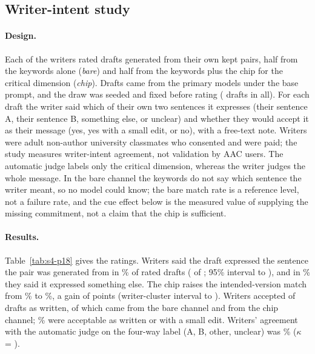 \subsection{Writer-intent study}\label{sec:waterfall}

\paragraph{Design.}
Each of the \jmpOneEightWriters{} writers rated \jmpOneEightPerWriter{} drafts generated from their own kept pairs, half from the keywords alone (\emph{bare}) and half from the keywords plus the chip for the critical dimension (\emph{chip}).
Drafts came from the \jmwmModels{} primary models under the base prompt, and the draw was seeded and fixed before rating (\jmpOneEightAcceptN{} drafts in all).
For each draft the writer said which of their own two sentences it expresses (their sentence A, their sentence B, something else, or unclear) and whether they would accept it as their message (yes, yes with a small edit, or no), with a free-text note.
Writers were adult non-author university classmates who consented and were paid; the study measures writer-intent agreement, not validation by AAC users.
The automatic judge labels only the critical dimension, whereas the writer judges the whole message.
In the bare channel the keywords do not say which sentence the writer meant, so no model could know; the bare match rate is a reference level, not a failure rate, and the cue effect below is the measured value of supplying the missing commitment, not a claim that the chip is sufficient.

\paragraph{Results.}
Table~\ref{tab:s4-p18} gives the ratings.
Writers said the draft expressed the sentence the pair was generated from in \jmpOneEightMatchAll{}\% of rated drafts (\jmpOneEightMatchAllK{} of \jmpOneEightMatchAllN{}; 95\% interval \jmpOneEightMatchAllLo{} to \jmpOneEightMatchAllHi{}), and in \jmpOneEightElse{}\% they said it expressed something else.
The chip raises the intended-version match from \jmpOneEightMatchBare{}\% to \jmpOneEightMatchChip{}\%, a gain of \jmpOneEightCueGain{} points (writer-cluster interval \jmpOneEightCueGainLo{} to \jmpOneEightCueGainHi{}).
Writers accepted \jmpOneEightAcceptYesK{} of \jmpOneEightAcceptN{} drafts as written, of which \jmpOneEightYesBareK{} came from the bare channel and \jmpOneEightYesChipK{} from the chip channel; \jmpOneEightAcceptYesSmall{}\% were acceptable as written or with a small edit.
Writers' agreement with the automatic judge on the four-way label (A, B, other, unclear) was \jmpOneEightAgreeFour{}\% ($\kappa$ = \jmpOneEightKappa{}).

